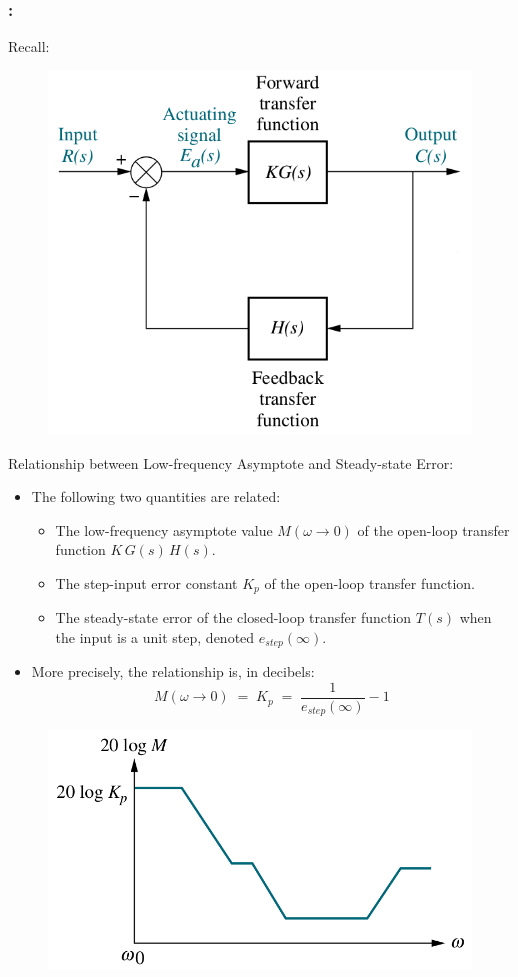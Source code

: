 \documentclass[ 10pt, xcolor = dvipsnames]{beamer}
\begin{document}
\begin{frame}[allowframebreaks]
\frametitle{\insertsection: \insertsubsection}

Recall: 
\begin{figure}
\centering
\includegraphics[width=0.5\columnwidth]{figures/Nise_Fig-8-1-a.jpg}
\end{figure}
\framebreak

Relationship between Low-frequency Asymptote and Steady-state Error: 
\begin{itemize}
\item The following two quantities are related: 
\begin{itemize}
\item The low-frequency asymptote value $M( \omega \rightarrow 0 )$ of the open-loop \linebreak transfer function $K \, G(s) \, H(s)$. 
\item The step-input error constant $K_p$ of the open-loop transfer function. 
\item The steady-state error of the closed-loop transfer function $T(s)$ when the input is a unit step, denoted $e_{step}(\infty)$. 
\end{itemize}
\item More precisely, the relationship is, in decibels: 
\[
M( \omega \rightarrow 0 ) \; = \; K_p \; = \;
\frac{1}{e_{step}(\infty)} - 1
\]
\end{itemize}
\framebreak

\begin{figure}
\centering
\includegraphics[width=0.6\columnwidth]{figures/Nise_Fig-10-51-a.jpg}
\end{figure}

\end{frame}
\end{document}
